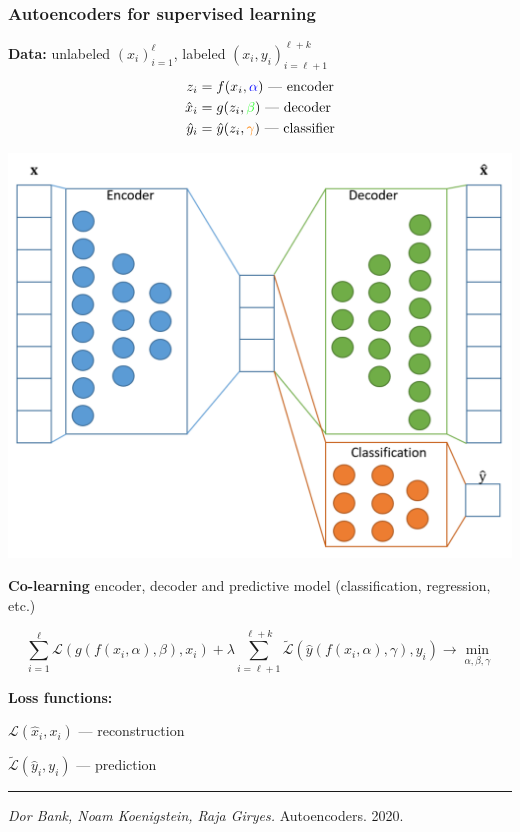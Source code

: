 \documentclass[fullscreen=true, bookmarks=true, hyperref={pdfencoding=unicode}]{beamer}
\begin{document}
\begin{frame}
  \frametitle{Autoencoders for supervised learning}

    {\bf Data:} unlabeled $(x_i)_{i=1}^\ell$, labeled $(x_i, y_i)_{i=\ell+1}^{\ell + k}$
    \begin{align*}
      z_i &= f(x_i, {\color{blue}\alpha}) \text{ — encoder} \\
      \hat x_i &= g(z_i, {\color{green}\beta}) \text{ — decoder} \\
      \hat y_i &= \hat y(z_i, {\color{orange}\gamma}) \text{ — classifier}
    \end{align*}
    \begin{center}
      \includegraphics[keepaspectratio,
                       width=.5\paperwidth]{autoenc_supervised.png}
    \end{center}
\end{frame}


\begin{frame}

    {\bf Co-learning} encoder, decoder and predictive model (classification, regression, etc.)

    $$\sum\limits_{i=1}^\ell \mathscr{L}(g(f(x_i, \alpha), \beta), x_i)
    + \lambda \sum\limits_{i=\ell+1}^{\ell+k} \tilde{\mathscr{L}}(\hat y(f(x_i, \alpha), \gamma), y_i) \to \min\limits_{\alpha, \beta, \gamma}$$

    \vspace{0.5cm}
    {\bf Loss functions:}

    $\mathscr{L}(\hat x_i, x_i)$ — reconstruction

    $\tilde{\mathscr{L}}(\hat y_i, y_i)$ — prediction

    \vspace{1cm}

    \noindent\rule{8cm}{0.4pt}

    {\footnotesize
    {\it Dor Bank, Noam Koenigstein, Raja Giryes.} Autoencoders. 2020.}
\end{frame}
\end{document}
